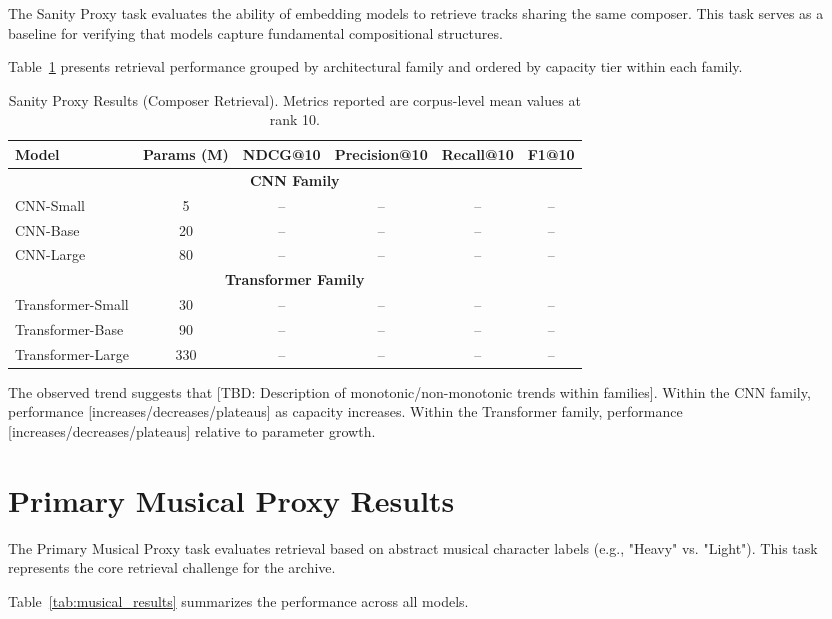 The Sanity Proxy task evaluates the ability of embedding models to retrieve tracks sharing the same composer. This task serves as a baseline for verifying that models capture fundamental compositional structures.

Table~\ref{tab:sanity_results} presents retrieval performance grouped by architectural family and ordered by capacity tier within each family.

\begin{table}[!htbp]
\centering
\caption{Sanity Proxy Results (Composer Retrieval). Metrics reported are corpus-level mean values at rank 10.}
\label{tab:sanity_results}
\begin{tabular}{lccccc}
\hline
\textbf{Model} & \textbf{Params (M)} & \textbf{NDCG@10} & \textbf{Precision@10} & \textbf{Recall@10} & \textbf{F1@10} \\
\hline
\multicolumn{6}{c}{\textbf{CNN Family}} \\
\hline
CNN-Small & 5  & -- & -- & -- & -- \\
CNN-Base  & 20 & -- & -- & -- & -- \\
CNN-Large & 80 & -- & -- & -- & -- \\
\hline
\multicolumn{6}{c}{\textbf{Transformer Family}} \\
\hline
Transformer-Small & 30  & -- & -- & -- & -- \\
Transformer-Base  & 90  & -- & -- & -- & -- \\
Transformer-Large & 330 & -- & -- & -- & -- \\
\hline
\end{tabular}
\end{table}



The observed trend suggests that [TBD: Description of monotonic/non-monotonic trends within families]. Within the CNN family, performance [increases/decreases/plateaus] as capacity increases. Within the Transformer family, performance [increases/decreases/plateaus] relative to parameter growth.

\section{Primary Musical Proxy Results}

The Primary Musical Proxy task evaluates retrieval based on abstract musical character labels (e.g., "Heavy" vs. "Light"). This task represents the core retrieval challenge for the archive.

Table~\ref{tab:musical_results} summarizes the performance across all models.

